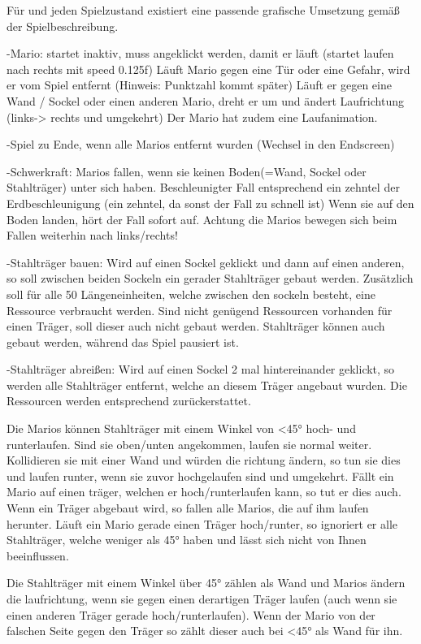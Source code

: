 F\"ur \everyObject{} und jeden Spielzustand existiert eine passende grafische Umsetzung gem\"a\ss{} der Spielbeschreibung.

-Mario: startet inaktiv, muss angeklickt werden, damit er läuft (startet laufen nach rechts mit speed 0.125f)
	Läuft Mario gegen eine Tür oder eine Gefahr, wird er vom Spiel entfernt (Hinweis: Punktzahl kommt später)
	Läuft er gegen eine Wand / Sockel oder einen anderen Mario, dreht er um und ändert Laufrichtung (links-> rechts und umgekehrt)
	Der Mario hat zudem eine Laufanimation.

-Spiel zu Ende, wenn alle Marios entfernt wurden (Wechsel in den Endscreen)

-Schwerkraft: Marios fallen, wenn sie keinen Boden(=Wand, Sockel oder Stahlträger) unter sich haben.
	Beschleunigter Fall entsprechend ein zehntel der Erdbeschleunigung (ein zehntel, da sonst der Fall zu schnell ist)
	Wenn sie auf den Boden landen, hört der Fall sofort auf.
	Achtung die Marios bewegen sich beim Fallen weiterhin nach links/rechts!

-Stahlträger bauen: Wird auf einen Sockel geklickt und dann auf einen anderen, so soll zwischen beiden Sockeln ein gerader Stahlträger gebaut werden.
	Zusätzlich soll für alle 50 Längeneinheiten, welche zwischen den sockeln besteht, eine Ressource verbraucht werden.
	Sind nicht genügend Ressourcen vorhanden für einen Träger, soll dieser auch nicht gebaut werden.
	Stahlträger können auch gebaut werden, während das Spiel pausiert ist.
	
-Stahlträger abreißen: Wird auf einen Sockel 2 mal hintereinander geklickt, so werden alle Stahlträger entfernt, welche an diesem Träger angebaut wurden.
	Die Ressourcen werden entsprechend zurückerstattet.

Die Marios können Stahlträger mit einem Winkel von <45° hoch- und runterlaufen. Sind sie oben/unten angekommen, laufen sie normal weiter. Kollidieren sie mit einer Wand und würden die richtung ändern, so tun sie dies und laufen runter, wenn sie zuvor hochgelaufen sind und umgekehrt. Fällt ein Mario auf einen träger, welchen er hoch/runterlaufen kann, so tut er dies auch.
Wenn ein Träger abgebaut wird, so fallen alle Marios, die auf ihm laufen herunter. Läuft ein Mario gerade einen Träger hoch/runter, so ignoriert er alle Stahlträger, welche weniger als 45° haben und lässt sich nicht von Ihnen beeinflussen.
	
Die Stahlträger mit einem Winkel über 45° zählen als Wand und Marios ändern die laufrichtung, wenn sie gegen einen derartigen Träger laufen (auch wenn sie einen anderen Träger gerade hoch/runterlaufen). Wenn der Mario von der falschen Seite gegen den Träger so zählt dieser auch bei <45° als Wand für ihn.
